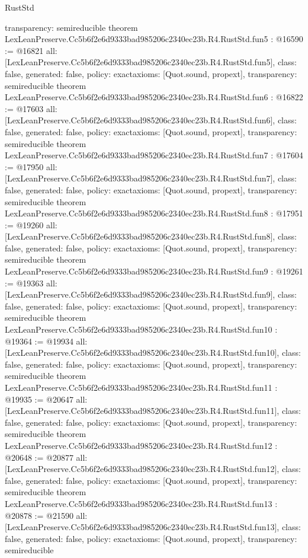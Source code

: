 \begin{lexlean}{RustStd}
\begin{coremodule}
{  transparency: semireducible
}
theorem LexLeanPreserve.Cc5b6f2e6d9333bad985206c2340ec23b.R4.RustStd.fun5 : @16590 := @16821 {
  all: [LexLeanPreserve.Cc5b6f2e6d9333bad985206c2340ec23b.R4.RustStd.fun5],
  class: false,
  generated: false,
  policy: exact{axioms: [Quot.sound, propext]},
  transparency: semireducible
}
theorem LexLeanPreserve.Cc5b6f2e6d9333bad985206c2340ec23b.R4.RustStd.fun6 : @16822 := @17603 {
  all: [LexLeanPreserve.Cc5b6f2e6d9333bad985206c2340ec23b.R4.RustStd.fun6],
  class: false,
  generated: false,
  policy: exact{axioms: [Quot.sound, propext]},
  transparency: semireducible
}
theorem LexLeanPreserve.Cc5b6f2e6d9333bad985206c2340ec23b.R4.RustStd.fun7 : @17604 := @17950 {
  all: [LexLeanPreserve.Cc5b6f2e6d9333bad985206c2340ec23b.R4.RustStd.fun7],
  class: false,
  generated: false,
  policy: exact{axioms: [Quot.sound, propext]},
  transparency: semireducible
}
theorem LexLeanPreserve.Cc5b6f2e6d9333bad985206c2340ec23b.R4.RustStd.fun8 : @17951 := @19260 {
  all: [LexLeanPreserve.Cc5b6f2e6d9333bad985206c2340ec23b.R4.RustStd.fun8],
  class: false,
  generated: false,
  policy: exact{axioms: [Quot.sound, propext]},
  transparency: semireducible
}
theorem LexLeanPreserve.Cc5b6f2e6d9333bad985206c2340ec23b.R4.RustStd.fun9 : @19261 := @19363 {
  all: [LexLeanPreserve.Cc5b6f2e6d9333bad985206c2340ec23b.R4.RustStd.fun9],
  class: false,
  generated: false,
  policy: exact{axioms: [Quot.sound, propext]},
  transparency: semireducible
}
theorem LexLeanPreserve.Cc5b6f2e6d9333bad985206c2340ec23b.R4.RustStd.fun10 : @19364 := @19934 {
  all: [LexLeanPreserve.Cc5b6f2e6d9333bad985206c2340ec23b.R4.RustStd.fun10],
  class: false,
  generated: false,
  policy: exact{axioms: [Quot.sound, propext]},
  transparency: semireducible
}
theorem LexLeanPreserve.Cc5b6f2e6d9333bad985206c2340ec23b.R4.RustStd.fun11 : @19935 := @20647 {
  all: [LexLeanPreserve.Cc5b6f2e6d9333bad985206c2340ec23b.R4.RustStd.fun11],
  class: false,
  generated: false,
  policy: exact{axioms: [Quot.sound, propext]},
  transparency: semireducible
}
theorem LexLeanPreserve.Cc5b6f2e6d9333bad985206c2340ec23b.R4.RustStd.fun12 : @20648 := @20877 {
  all: [LexLeanPreserve.Cc5b6f2e6d9333bad985206c2340ec23b.R4.RustStd.fun12],
  class: false,
  generated: false,
  policy: exact{axioms: [Quot.sound, propext]},
  transparency: semireducible
}
theorem LexLeanPreserve.Cc5b6f2e6d9333bad985206c2340ec23b.R4.RustStd.fun13 : @20878 := @21590 {
  all: [LexLeanPreserve.Cc5b6f2e6d9333bad985206c2340ec23b.R4.RustStd.fun13],
  class: false,
  generated: false,
  policy: exact{axioms: [Quot.sound, propext]},
  transparency: semireducible
}
\end{coremodule}
\end{lexlean}
